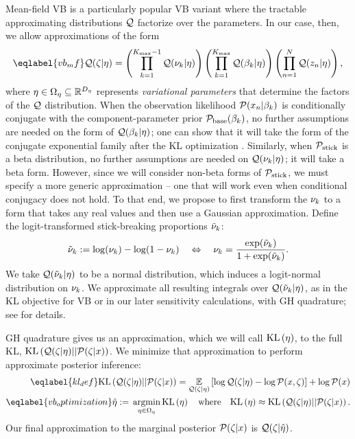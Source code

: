 Mean-field VB is a particularly popular VB variant where the tractable
approximating distributions $\mathcal{Q}$ factorize over the parameters. In our case,
then, we allow approximations of the form
%
\begin{align}\eqlabel{vb_mf}
%
\q(\zeta \vert \eta) =
    \left( \prod_{\k=1}^{\kmax - 1} \q(\nuk \vert \eta) \right)
    \left( \prod_{\k=1}^{\kmax} \q(\beta_\k \vert \eta) \right)
    \left( \prod_{\n=1}^{\N} \q(\z_{\n} \vert \eta) \right),
%
\end{align}
%
where $\eta \in \Omega_{\eta} \subseteq \mathbb{R}^{{D_{\eta}}}$ represents
\emph{variational parameters} that determine the factors of the $\mathcal{Q}$
distribution. When the observation likelihood $\mathcal{P}(x_n \vert \beta_k)$ is
conditionally conjugate with the component-parameter prior
$\mathcal{P}_{\mathrm{base}}(\beta_k)$, no further assumptions are needed on the form of
$\mathcal{Q}(\beta_k \vert \eta)$; one can show that it will take the form of the
conjugate exponential family after the KL optimization
\citep{blei:2017:vi_review}. Similarly, when $\mathcal{P}_{\mathrm{stick}}$ is a beta distribution,
no further assumptions are needed on $\mathcal{Q}(\nu_{k} \vert \eta)$; it will take a beta
form. However, since we will consider non-beta forms of $\mathcal{P}_{\mathrm{stick}}$, we must
specify a more generic approximation -- one that will work even when conditional
conjugacy does not hold.  To that end, we propose to first transform the
$\nu_{k}$ to a form that takes any real values and then use a Gaussian
approximation. Define the logit-transformed stick-breaking proportions $\tilde{\nu}_{k}$:
%
\begin{align*}
  \lnu_\k := \log(\nu_\k) - \log(1 - \nu_\k)
  \quad \Leftrightarrow \quad
  \nuk = \frac{\exp(\lnu_\k)}{1 + \exp(\lnu_\k)}.
\end{align*}
%
We take $\mathcal{Q}(\tilde{\nu}_{k} \vert \eta)$ to be a normal distribution, which induces a
logit-normal distribution on $\nu_{k}$. We approximate all resulting integrals over
$\mathcal{Q}(\tilde{\nu}_{k} \vert \eta)$, as in the KL objective for VB or in our later
sensitivity calculations, with GH quadrature; see  for
details.

GH quadrature gives us an approximation, which we will call $\mathrm{KL}\left(\eta\right)$, to the
full KL, $\mathrm{KL}\left(\mathcal{Q}(\zeta \vert \eta) || \mathcal{P}(\zeta \vert x)\right)$. We minimize that
approximation to perform approximate posterior inference:
%
\begin{align}
%
\eqlabel{kl_def}
\KL{\q(\zeta \vert \eta) || \p(\zeta \vert \x)}
={}    \expect{\q(\zeta \vert \eta)}{
        \log \q(\zeta \vert \eta) - \log\p(\x, \zeta)} + \log\p(\x) \\
%
\eqlabel{vb_optimization}
\etaopt :={} \argmin_{\eta \in \etadom} \KL{\eta} \mathwhere
\KL{\eta} \approx{} \KL{\q(\zeta \vert \eta) || \p(\zeta \vert \x)}.
%
\end{align}
%
Our final approximation to the marginal posterior $\mathcal{P}(\zeta \vert x)$ is
$\mathcal{Q}(\zeta \vert \hat\eta)$.

